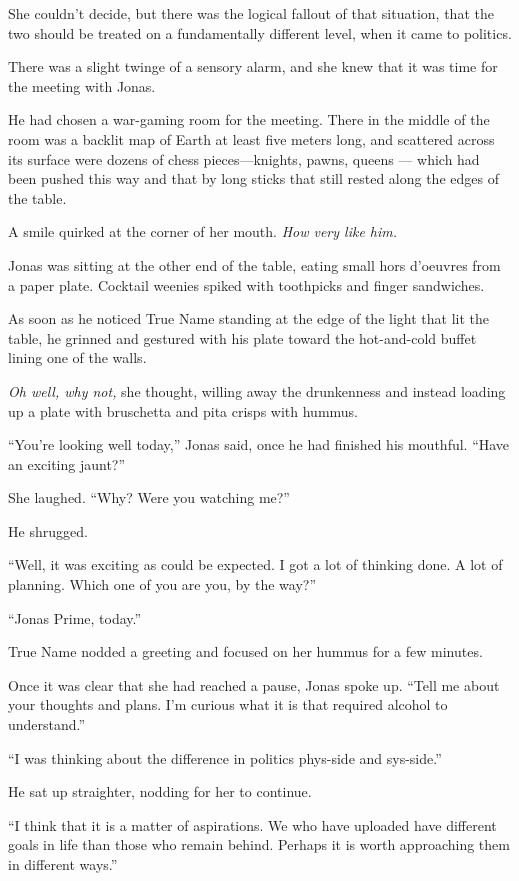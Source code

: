 She couldn't decide, but there was the logical fallout of that situation, that the two should be treated on a fundamentally different level, when it came to politics.

There was a slight twinge of a sensory alarm, and she knew that it was time for the meeting with Jonas.

He had chosen a war-gaming room for the meeting. There in the middle of the room was a backlit map of Earth at least five meters long, and scattered across its surface were dozens of chess pieces---knights, pawns, queens — which had been pushed this way and that by long sticks that still rested along the edges of the table.

A smile quirked at the corner of her mouth. \emph{How very like him.}

Jonas was sitting at the other end of the table, eating small hors d'oeuvres from a paper plate. Cocktail weenies spiked with toothpicks and finger sandwiches.

As soon as he noticed True Name standing at the edge of the light that lit the table, he grinned and gestured with his plate toward the hot-and-cold buffet lining one of the walls.

\emph{Oh well, why not,} she thought, willing away the drunkenness and instead loading up a plate with bruschetta and pita crisps with hummus.

``You're looking well today,'' Jonas said, once he had finished his mouthful. ``Have an exciting jaunt?''

She laughed. ``Why? Were you watching me?''

He shrugged.

``Well, it was exciting as could be expected. I got a lot of thinking done. A lot of planning. Which one of you are you, by the way?''

``Jonas Prime, today.''

True Name nodded a greeting and focused on her hummus for a few minutes.

Once it was clear that she had reached a pause, Jonas spoke up. ``Tell me about your thoughts and plans. I'm curious what it is that required alcohol to understand.''

``I was thinking about the difference in politics phys-side and sys-side.''

He sat up straighter, nodding for her to continue.

``I think that it is a matter of aspirations. We who have uploaded have different goals in life than those who remain behind. Perhaps it is worth approaching them in different ways.''

